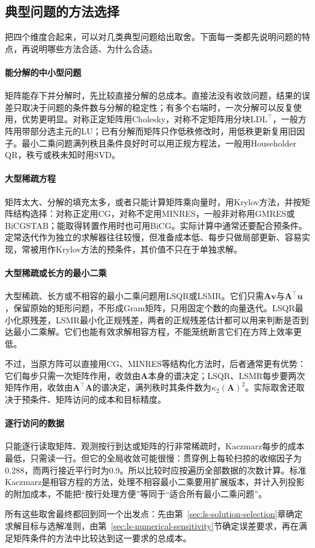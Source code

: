 \subsection{典型问题的方法选择}
\label{sec:ls-method-selection-scenarios}

把四个维度合起来，可以对几类典型问题给出取舍。下面每一类都先说明问题的特点，再说明哪些方法合适、为什么合适。

\paragraph{能分解的中小型问题}
矩阵能存下并分解时，先比较直接分解的总成本。直接法没有收敛问题，结果的误差只取决于问题的条件数与分解的稳定性；有多个右端时，一次分解可以反复使用，优势更明显。对称正定矩阵用Cholesky，对称不定矩阵用分块$\mathrm{LDL}^\top$，一般方阵用带部分选主元的LU；已有分解而矩阵只作低秩修改时，用低秩更新复用旧因子。最小二乘问题满列秩且条件良好时可以用正规方程法，一般用Householder QR，秩亏或秩未知时用SVD。

\paragraph{大型稀疏方程}
矩阵太大、分解的填充太多，或者只能计算矩阵乘向量时，用Krylov方法，并按矩阵结构选择：对称正定用CG，对称不定用MINRES，一般非对称用GMRES或BiCGSTAB；能取得转置作用时也可用BiCG。实际计算中通常还要配合预条件。定常迭代作为独立的求解器往往较慢，但准备成本低、每步只做局部更新、容易实现，常被用作Krylov方法的预条件，其价值不只在于单独求解。

\paragraph{大型稀疏或长方的最小二乘}
大型稀疏、长方或不相容的最小二乘问题用LSQR或LSMR。它们只需$\bm A\bm v$与$\bm A^\top\bm u$，保留原始的矩形问题，不形成Gram矩阵，只用固定个数的向量迭代。LSQR最小化原残差，LSMR最小化正规残差，两者的正规残差估计都可以用来判断是否到达最小二乘解。它们也能有效求解相容方程，不能笼统断言它们在方阵上效率更低。

不过，当原方阵可以直接用CG、MINRES等结构化方法时，后者通常更有优势：它们每步只需一次矩阵作用，收敛由$\bm A$本身的谱决定；LSQR、LSMR每步要两次矩阵作用，收敛由$\bm A^\top\bm A$的谱决定，满列秩时其条件数为$\kappa_2(\bm A)^2$。实际取舍还取决于预条件、矩阵访问的成本和目标精度。

\paragraph{逐行访问的数据}
只能逐行读取矩阵、观测按行到达或矩阵的行非常稀疏时，Kaczmarz每步的成本最低，只需读一行。但它的全局收敛可能很慢：贯穿例上每轮扫掠的收缩因子为$0.288$，而两行接近平行时为$0.9$。所以比较时应按遍历全部数据的次数计算。标准Kaczmarz是相容方程的方法，处理不相容最小二乘要用扩展版本，并计入列投影的附加成本，不能把“按行处理方便”等同于“适合所有最小二乘问题”。

所有这些取舍最终都回到同一个出发点：先由第~\ref{sec:ls-solution-selection}章确定求解目标与选解准则，由第~\ref{sec:ls-numerical-sensitivity}节确定误差要求，再在满足矩阵条件的方法中比较达到这一要求的总成本。

